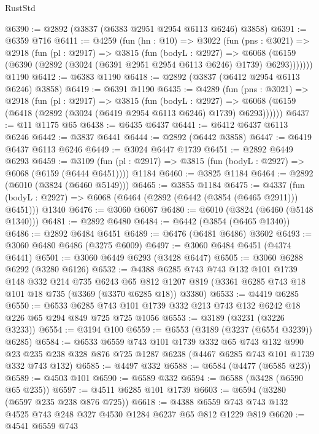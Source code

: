 \begin{lexlean}{RustStd}
\begin{coremodule}
@6390 := @2892 (@3837 (@6383 @2951 @2954 @6113 @6246) @3858)
@6391 := @6359 @716
@6411 := @4259
    (fun (hn : @10) =>
    @3022
      (fun (pns : @3021) =>
      @2918
        (fun (pl : @2917) =>
        @3815
          (fun (bodyL : @2927) =>
          @6068 (@6159 (@6390 (@2892 (@3024 (@6391 @2951 @2954 @6113 @6246) @1739) @6293)))))))
    @1190
@6412 := @6383 @1190
@6418 := @2892 (@3837 (@6412 @2954 @6113 @6246) @3858)
@6419 := @6391 @1190
@6435 := @4289
    (fun (pns : @3021) =>
    @2918
      (fun (pl : @2917) =>
      @3815
        (fun (bodyL : @2927) =>
        @6068 (@6159 (@6418 (@2892 (@3024 (@6419 @2954 @6113 @6246) @1739) @6293))))))
@6437 := @11 @1175 @65
@6438 := @6435 @6437
@6441 := @6412 @6437 @6113 @6246
@6442 := @3837 @6441
@6444 := @2892 (@6442 @3858)
@6447 := @6419 @6437 @6113 @6246
@6449 := @3024 @6447 @1739
@6451 := @2892 @6449 @6293
@6459 := @3109
    (fun (pl : @2917) => @3815 (fun (bodyL : @2927) => @6068 (@6159 (@6444 @6451))))
    @1184
@6460 := @3825 @1184
@6464 := @2892 (@6010 (@3824 (@6460 @5149)))
@6465 := @3855 @1184
@6475 := @4337
    (fun (bodyL : @2927) => @6068 (@6464 (@2892 (@6442 (@3854 (@6465 @2911))) @6451)))
    @1340
@6476 := @3060 @6067
@6480 := @6010 (@3824 (@6460 (@5148 @1340)))
@6481 := @2892 @6480
@6484 := @6442 (@3854 (@6465 @1340))
@6486 := @2892 @6484 @6451
@6489 := @6476 (@6481 @6486) @3602
@6493 := @3060 @6480 @6486 (@3275 @6009)
@6497 := @3060 @6484 @6451 (@4374 @6441)
@6501 := @3060 @6449 @6293 (@3428 @6447)
@6505 := @3060 @6288 @6292 (@3280 @6126)
@6532 := @4388
    @6285
    @743
    @743
    @132
    @101
    @1739
    @148
    @332
    @214
    @735
    @6243
    @65
    @812
    @1207
    @819
    (@3361 @6285 @743 @18 @101 @18 @735 (@3369 (@3370 @6285 @18)) @3380)
@6533 := @4419 @6285
@6550 := @6533
    @6285
    @743
    @101
    @1739
    @332
    @213
    @743
    @132
    @6242
    @18
    @226
    @65
    @294
    @849
    @725
    @725
    @1056
@6553 := @3189 (@3231 (@3226 @3233))
@6554 := @3194 @100
@6559 := @6553 (@3189 (@3237 (@6554 @3239)) @6285)
@6584 := @6533
    @6559
    @743
    @101
    @1739
    @332
    @65
    @743
    @132
    @990
    @23
    @235
    @238
    @328
    @876
    @725
    @1287
    @6238
    (@4467 @6285 @743 @101 @1739 @332 @743 @132)
@6585 := @4497 @332
@6588 := @6584 (@4477 (@6585 @23))
@6589 := @4503 @101
@6590 := @6589 @332
@6594 := @6588 (@3428 (@6590 @65 @235))
@6597 := @4511 @6285 @101 @1739
@6603 := @6594 (@3280 (@6597 @235 @238 @876 @725))
@6618 := @4388 @6559 @743 @743 @132 @4525 @743 @248 @327 @4530 @1284 @6237 @65 @812 @1229 @819
@6620 := @4541 @6559 @743

\end{coremodule}
\end{lexlean}
